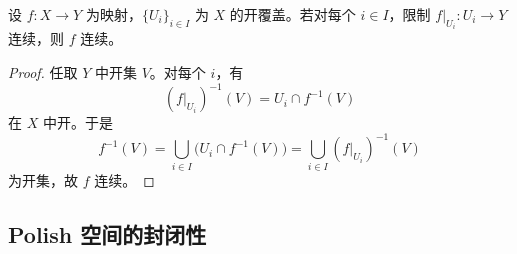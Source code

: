 \documentclass[lang=cn,a4paper,newtx,figureplace=section,tableplace=section]{elegantbook}
\begin{document}
\begin{lemma}[粘贴引理]\label{lem:gluing}
  设 $f:X\to Y$ 为映射，$\{U_i\}_{i\in I}$ 为 $X$ 的开覆盖。若对每个 $i\in I$，限制 $f|_{U_i}:U_i\to Y$ 连续，则 $f$ 连续。
\end{lemma}
\begin{proof}
  任取 $Y$ 中开集 $V$。对每个 $i$，有
  \[
    (f|_{U_i})^{-1}(V)=U_i\cap f^{-1}(V)
  \]
  在 $X$ 中开。于是
  \[
    f^{-1}(V)=\bigcup_{i\in I}\big(U_i\cap f^{-1}(V)\big)=\bigcup_{i\in I}(f|_{U_i})^{-1}(V)
  \]
  为开集，故 $f$ 连续。
\end{proof}

\subsection{Polish 空间的封闭性}
\end{document}
